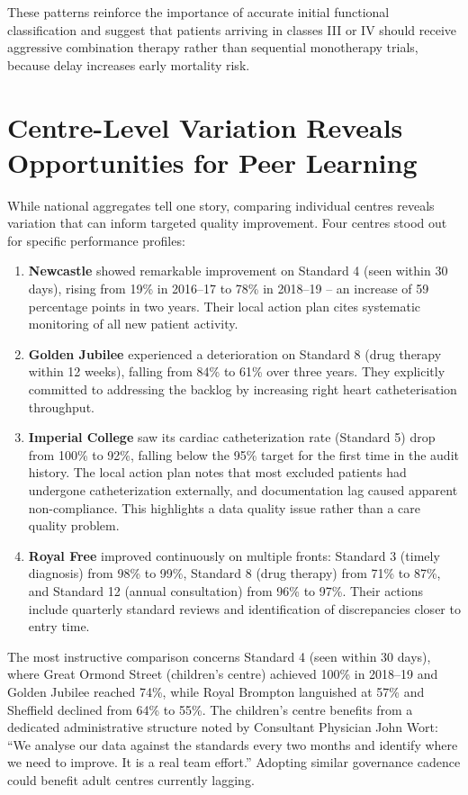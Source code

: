 \documentclass[11pt,a4paper]{article}
\begin{document}
These patterns reinforce the importance of accurate initial functional classification and suggest that patients arriving in classes III or IV should receive aggressive combination therapy rather than sequential monotherapy trials, because delay increases early mortality risk.

\section{Centre-Level Variation Reveals Opportunities for Peer Learning}

While national aggregates tell one story, comparing individual centres reveals variation that can inform targeted quality improvement. Four centres stood out for specific performance profiles:

\begin{enumerate}[leftmargin=*]
\item \textbf{Newcastle} showed remarkable improvement on Standard 4 (seen within 30 days), rising from 19\% in 2016--17 to 78\% in 2018--19 -- an increase of 59 percentage points in two years. Their local action plan cites systematic monitoring of all new patient activity.
\item \textbf{Golden Jubilee} experienced a deterioration on Standard 8 (drug therapy within 12 weeks), falling from 84\% to 61\% over three years. They explicitly committed to addressing the backlog by increasing right heart catheterisation throughput.
\item \textbf{Imperial College} saw its cardiac catheterization rate (Standard 5) drop from 100\% to 92\%, falling below the 95\% target for the first time in the audit history. The local action plan notes that most excluded patients had undergone catheterization externally, and documentation lag caused apparent non-compliance. This highlights a data quality issue rather than a care quality problem.
\item \textbf{Royal Free} improved continuously on multiple fronts: Standard 3 (timely diagnosis) from 98\% to 99\%, Standard 8 (drug therapy) from 71\% to 87\%, and Standard 12 (annual consultation) from 96\% to 97\%. Their actions include quarterly standard reviews and identification of discrepancies closer to entry time.
\end{enumerate}

The most instructive comparison concerns Standard 4 (seen within 30 days), where Great Ormond Street (children's centre) achieved 100\% in 2018--19 and Golden Jubilee reached 74\%, while Royal Brompton languished at 57\% and Sheffield declined from 64\% to 55\%. The children's centre benefits from a dedicated administrative structure noted by Consultant Physician John Wort: ``We analyse our data against the standards every two months and identify where we need to improve. It is a real team effort.'' Adopting similar governance cadence could benefit adult centres currently lagging.
\end{document}
